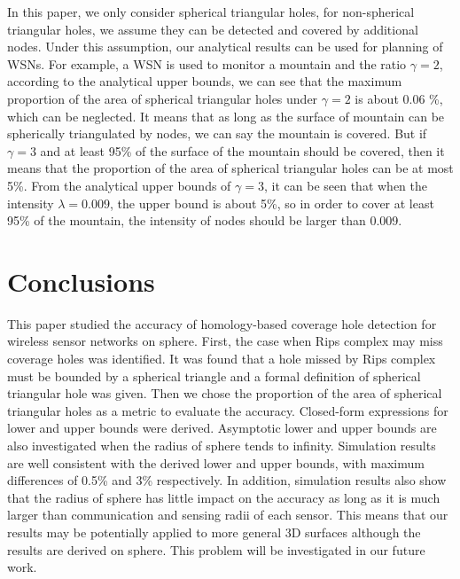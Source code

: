 \documentclass[journal, twoside]{IEEEtran}
\begin{document}
In this paper, we only consider spherical
triangular holes, for non-spherical triangular holes, we assume
they can be detected and covered by additional nodes. Under this
assumption, our analytical results can be used for planning 
of WSNs. For example, a WSN is used to monitor a mountain and 
the ratio $\gamma = 2$, according to the analytical upper bounds, 
we can see that the maximum proportion of the area of spherical triangular
holes under $\gamma = 2$ is about 0.06 \%, which can be neglected.
It means that as long as the surface of mountain can be 
spherically triangulated by nodes, we can say the mountain
is covered. But if $\gamma = 3$ and at least 95\% of the surface of 
the mountain should be covered, then it means that the proportion
of the area of spherical triangular holes can be at most 5\%.
From the analytical upper bounds of $\gamma = 3$, it can be 
seen that when the intensity $\lambda = 0.009$, the upper bound
is about 5\%, so in order to cover at least 95\% of the mountain,
the intensity of nodes should be larger than 0.009.


















\section{Conclusions}

This paper studied the accuracy of homology-based coverage hole detection for wireless
sensor networks on sphere. First, the case when Rips complex may miss coverage
holes was identified. It was found that a hole missed by Rips complex must be 
bounded by a spherical triangle and a formal definition of spherical triangular
hole was given. Then we chose the proportion of the area of spherical triangular
holes as a metric to evaluate the accuracy. Closed-form expressions for
lower and upper bounds were derived. Asymptotic lower and upper bounds
are also investigated when the radius of sphere tends to infinity. 
Simulation results are well consistent with
the derived lower and upper bounds, with maximum differences of 0.5\% and 3\% respectively.
In addition, simulation results also show that the radius of sphere has little 
impact on the accuracy as long as it is much larger than communication and sensing 
radii of each sensor. This means that our results may be potentially applied to more general 3D surfaces
although the results are derived on sphere. This problem will be investigated in our future work.
\end{document}
